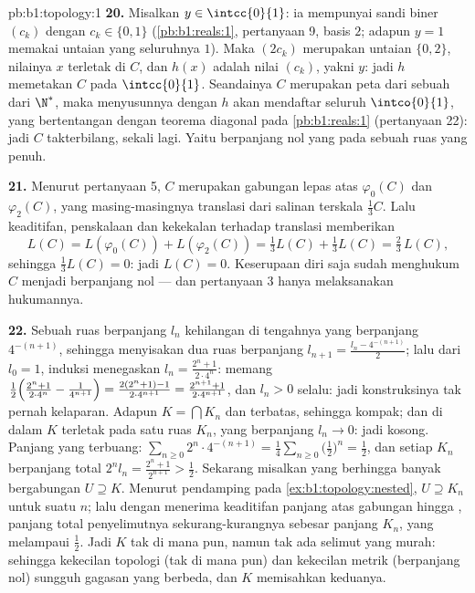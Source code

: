 \begin{solution}{pb:b1:topology:1}
\textbf{20.} Misalkan $y \in \intcc{0}{1}$: ia mempunyai sandi biner
$(c_k)$ dengan $c_k \in \{0, 1\}$ (\cref{pb:b1:reals:1}, pertanyaan
9, basis $2$; adapun $y = 1$ memakai untaian yang seluruhnya $1$). Maka $(2c_k)$
merupakan untaian $\{0,2\}$, nilainya $x$ terletak di $C$, dan $h(x)$ adalah
nilai $(c_k)$, yakni $y$: jadi $h$ memetakan $C$ pada
$\intcc{0}{1}$. Seandainya $C$ merupakan peta dari sebuah  dari $\N^*$,
maka menyusunnya dengan $h$ akan mendaftar seluruh $\intco{0}{1}$,
yang bertentangan dengan teorema diagonal pada \cref{pb:b1:reals:1}
(pertanyaan 22): jadi $C$ takterbilang, sekali lagi. Yaitu  berpanjang nol
yang  pada sebuah ruas yang penuh.

\textbf{21.} Menurut pertanyaan 5, $C$ merupakan gabungan lepas atas
$\varphi_0(C)$ dan $\varphi_2(C)$, yang masing-masingnya translasi dari
salinan terskala $\frac13 C$. Lalu keaditifan, penskalaan dan kekekalan terhadap
translasi memberikan
\[
L(C) = L(\varphi_0(C)) + L(\varphi_2(C))
= \tfrac13 L(C) + \tfrac13 L(C) = \tfrac23\,L(C),
\]
sehingga $\frac13 L(C) = 0$: jadi $L(C) = 0$. Keserupaan diri saja sudah
menghukum $C$ menjadi berpanjang nol --- dan pertanyaan 3 hanya melaksanakan
hukumannya.

\textbf{22.} Sebuah ruas berpanjang $l_n$ kehilangan  di tengahnya
yang berpanjang $4^{-(n+1)}$, sehingga menyisakan dua ruas berpanjang $l_{n+1}
= \frac{l_n - 4^{-(n+1)}}{2}$; lalu dari $l_0 = 1$, induksi
menegaskan $l_n = \frac{2^n + 1}{2\cdot4^n}$: memang
$\frac12\Bigl(\frac{2^n+1}{2\cdot4^n} - \frac{1}{4^{n+1}}\Bigr)
= \frac{2(2^n + 1) - 1}{2\cdot4^{n+1}} = \frac{2^{n+1} +
1}{2\cdot4^{n+1}}$, dan $l_n > 0$ selalu: jadi konstruksinya tak pernah
kelaparan. Adapun $K = \bigcap K_n$  dan terbatas, sehingga kompak;
dan  di dalam $K$ terletak pada satu ruas $K_n$, yang berpanjang
$l_n \to 0$: jadi  kosong. Panjang yang terbuang: $\sum_{n\geq0} 2^n
\cdot 4^{-(n+1)} = \frac14\sum_{n\geq0}\bigl(\frac12\bigr)^n =
\frac12$, dan setiap $K_n$ berpanjang total $2^n l_n = \frac{2^n +
1}{2^{n+1}} > \frac12$. Sekarang misalkan   yang berhingga banyak
bergabungan $U \supseteq K$. Menurut  pendamping pada
\cref{ex:b1:topology:nested}, $U \supseteq K_n$ untuk suatu $n$;
lalu dengan menerima keaditifan panjang atas gabungan hingga ,
panjang total  penyelimutnya sekurang-kurangnya sebesar panjang
$K_n$, yang melampaui $\frac12$. Jadi $K$ tak  di mana pun, namun tak ada
selimut yang murah: sehingga kekecilan topologi (tak  di mana pun) dan
kekecilan metrik (berpanjang nol) sungguh gagasan yang berbeda,
dan $K$ memisahkan keduanya.


\end{solution}
